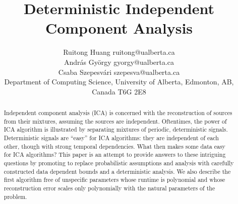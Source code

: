 \documentclass[twoside,11pt]{article}
\title{Deterministic Independent Component Analysis}
\author{\name Ruitong Huang \email ruitong@ualberta.ca \\
\name Andr\'as Gy\"orgy \email gyorgy@ualberta.ca \\
\name Csaba Szepesv\'ari \email szepesva@ualberta.ca \\
\addr Department of Computing Science, University of Alberta,
Edmonton, AB, Canada T6G 2E8 }
\begin{document}
 
\maketitle

\begin{abstract}
Independent component analysis (ICA) is concerned with the reconstruction of sources from their mixtures, assuming the sources are independent. 
Oftentimes, the power of ICA algorithm is illustrated by separating mixtures of periodic, deterministic signals.
Deterministic signals are ``easy'' for ICA algorithms: they are independent of each other, though with strong temporal dependencies.
What then makes some data easy for ICA algorithms?
This paper is an attempt to provide answers to these intriguing questions by promoting to replace probabilistic assumptions
and analysis with carefully constructed data dependent bounds and a deterministic analysis.
We also describe the first algorithm free of unspecific parameters whose runtime is polynomial and whose
reconstruction error scales only polynomially with the natural parameters of the problem. 
\end{abstract}
\end{document}
